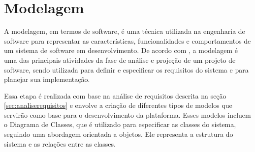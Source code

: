 \documentclass[tcc,capa]{texufpel}
\begin{document}



\section{Modelagem}
\label{sec:modelagem}
A modelagem, em termos de software, é uma técnica utilizada na engenharia de software para representar as características, funcionalidades e comportamentos de um sistema de software em desenvolvimento. De acordo com \citet{PRESSMAN:2016}, a modelagem é uma das principais atividades da fase de análise e projeção de um projeto de software, sendo utilizada para definir e especificar os requisitos do sistema e para planejar sua implementação.

Essa etapa é realizada com base na análise de requisitos descrita na seção \ref{sec:analiserequisitos} e envolve a criação de diferentes tipos de modelos que servirão como base para o desenvolvimento da plataforma. Esses modelos incluem o Diagrama de Classes, que é utilizado para especificar as classes do sistema, seguindo uma abordagem orientada a objetos. Ele representa a estrutura do sistema e as relações entre as classes.
\end{document}
